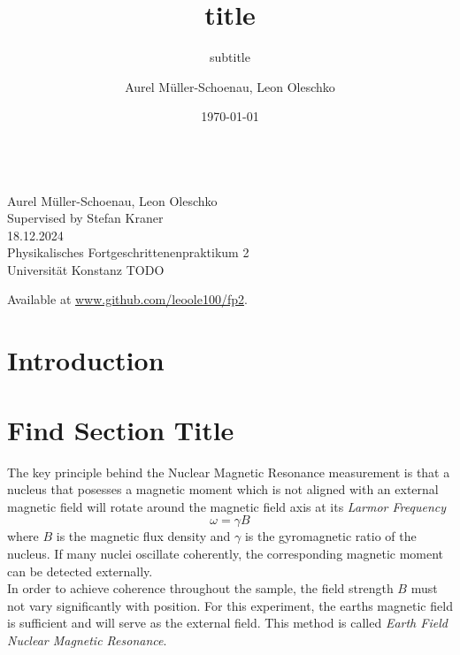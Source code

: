 \documentclass[
    parskip=half, 
    twoside=false,
    twocolumn=true,
    fontsize=11pt,
]{scrarticle}
\begin{document}
\title{title}
\subtitle{subtitle}
\author{Aurel Müller-Schoenau, Leon Oleschko}
\date{\dotdate\today}


\begin{titlepage}
    \sffamily
    \vspace*{3cm}
    {
        \fontsize{32}{32}
    }
    \vspace{.25cm}\\
    {
        \Large
        Aurel Müller-Schoenau, Leon Oleschko\\
        Supervised by Stefan Kraner
        \vspace{.05cm}\\
        18.12.2024
        \vspace{.25cm}\\
        \normalsize
        Physikalisches Fortgeschrittenenpraktikum 2\\
        Universität Konstanz
    }
    \vfill
    {
        \normalfont\normalsize 
        TODO
    }
    \vfill
    \begin{flushright}
        Available at \url{www.github.com/leoole100/fp2}.
    \end{flushright}
\end{titlepage}

\section{Introduction}

\section{Find Section Title}

The key principle behind the Nuclear Magnetic Resonance measurement is that a nucleus that posesses a magnetic moment which is not aligned with an external magnetic field will rotate around the magnetic field axis at its \textit{Larmor Frequency}
\begin{equation}
\label{eq:larmor_frequency}
 \omega = \gamma B
\end{equation}
where $B$ is the magnetic flux density and $\gamma$ is the gyromagnetic ratio of the nucleus. If many nuclei oscillate coherently, the corresponding magnetic moment can be detected externally.\\
In order to achieve coherence throughout the sample, the field strength $B$ must not vary significantly with position. For this experiment, the earths magnetic field is sufficient and will serve as the external field. This method is called \textit{Earth Field Nuclear Magnetic Resonance}.
\end{document}
